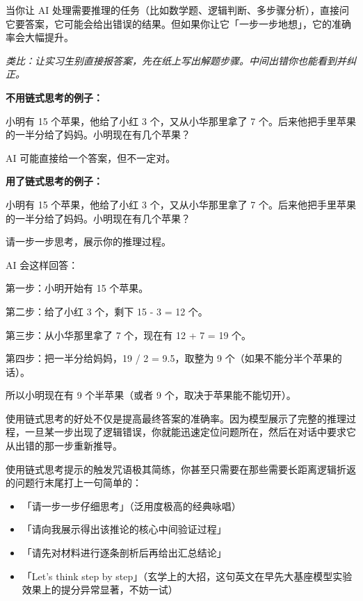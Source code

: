 当你让 AI 处理需要推理的任务（比如数学题、逻辑判断、多步骤分析），直接问它要答案，它可能会给出错误的结果。但如果你让它「一步一步地想」，它的准确率会大幅提升。

\textit{类比：让实习生别直接报答案，先在纸上写出解题步骤。中间出错你也能看到并纠正。}

\textbf{不用链式思考的例子：}

\begin{promptbox}
小明有 15 个苹果，他给了小红 3 个，又从小华那里拿了 7 个。后来他把手里苹果的一半分给了妈妈。小明现在有几个苹果？
\end{promptbox}

AI 可能直接给一个答案，但不一定对。

\textbf{用了链式思考的例子：}

\begin{promptbox}
小明有 15 个苹果，他给了小红 3 个，又从小华那里拿了 7 个。后来他把手里苹果的一半分给了妈妈。小明现在有几个苹果？

请一步一步思考，展示你的推理过程。
\end{promptbox}

AI 会这样回答：
\begin{aibox}
第一步：小明开始有 15 个苹果。

第二步：给了小红 3 个，剩下 15 - 3 = 12 个。

第三步：从小华那里拿了 7 个，现在有 12 + 7 = 19 个。

第四步：把一半分给妈妈，19 / 2 = 9.5，取整为 9 个（如果不能分半个苹果的话）。

所以小明现在有 9 个半苹果（或者 9 个，取决于苹果能不能切开）。
\end{aibox}

使用链式思考的好处不仅是提高最终答案的准确率。因为模型展示了完整的推理过程，一旦某一步出现了逻辑错误，你就能迅速定位问题所在，然后在对话中要求它从出错的那一步重新推导。

使用链式思考提示的触发咒语极其简练，你甚至只需要在那些需要长距离逻辑折返的问题行末尾打上一句简单的：

\begin{itemize}
  \item 「请一步一步仔细思考」（泛用度极高的经典咏唱）
  \item 「请向我展示得出该推论的核心中间验证过程」
  \item 「请先对材料进行逐条剖析后再给出汇总结论」
  \item 「Let's think step by step」（玄学上的大招，这句英文在早先大基座模型实验效果上的提分异常显著，不妨一试）
\end{itemize}

